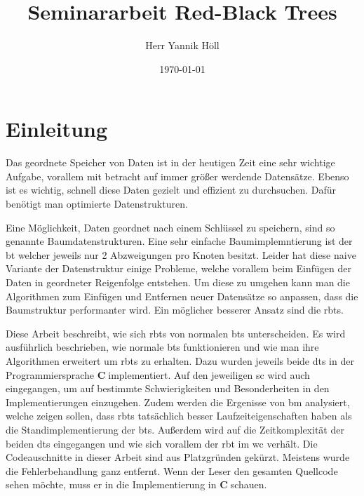 \documentclass[11pt]{article}
\title{\textbf{Seminararbeit Red-Black Trees}}
\author{Herr Yannik Höll}
\date{\today}
\newcommand{\cpl}{\textbf{C}$\;$}
\begin{document}
\begin{titlingpage}
    \maketitle
\end{titlingpage}
\pagebreak

\tableofcontents
\pagebreak

\listoffigures
\pagebreak

\glsaddall
\printglossary
\pagebreak

\section{Einleitung}

Das geordnete Speicher von Daten ist in der heutigen Zeit eine sehr wichtige Aufgabe, vorallem mit betracht auf immer größer werdende Datensätze.
Ebenso ist es wichtig, schnell diese Daten gezielt und effizient zu durchsuchen. Dafür benötigt man optimierte Datenstrukturen. 

Eine Möglichkeit, Daten geordnet nach einem Schlüssel zu speichern, sind so genannte Baumdatenstrukturen.
Eine sehr einfache Baumimplemntierung ist der \gls{bt} welcher jeweils nur 2 Abzweigungen pro Knoten besitzt.
Leider hat diese naive Variante der Datenstruktur einige Probleme, welche vorallem beim Einfügen der Daten in geordneter Reigenfolge entstehen.
Um diese zu umgehen kann man die Algorithmen zum Einfügen und Entfernen neuer Datensätze so anpassen, dass die Baumstruktur performanter wird.
Ein möglicher besserer Ansatz sind die \glspl{rbt}.

Diese Arbeit beschreibt, wie sich \glspl{rbt} von normalen \glspl{bt} unterscheiden. Es wird ausführlich beschrieben, wie normale \glspl{bt} funktionieren und wie man
ihre Algorithmen erweitert um \glspl{rbt} zu erhalten.
Dazu wurden jeweils beide \glspl{dt} in der Programmiersprache \cpl implementiert. Auf den jeweiligen \gls{sc} wird auch eingegangen, um auf bestimmte Schwierigkeiten und Besonderheiten in den Implementierungen einzugehen.
Zudem werden die Ergenisse von \gls{bm} analysiert, welche zeigen sollen, dass \glspl{rbt} tatsächlich besser Laufzeiteigenschaften haben als
die Standimplementierung der \glspl{bt}.
Außerdem wird auf die Zeitkomplexität der beiden \glspl{dt} eingegangen und wie sich vorallem der \gls{rbt} im \gls{wc} verhält.
Die Codeauschnitte in dieser Arbeit sind aus Platzgründen gekürzt. Meistens wurde die Fehlerbehandlung ganz entfernt.
Wenn der Leser den gesamten Quellcode sehen möchte, muss er in die Implementierung in \cpl schauen. 
\end{document}
